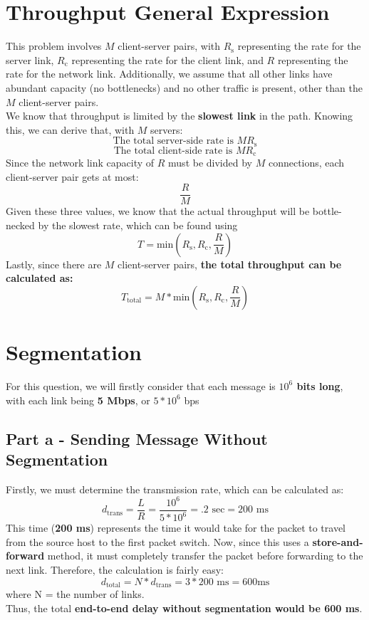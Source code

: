 \documentclass{article}
\begin{document}
\section{Throughput General Expression}
This problem involves $M$ client-server pairs, with $R_{\text{s}}$ representing the rate for the server link, $R_{\text{c}}$ representing the rate for the client link, and $R$ representing the rate for the network link. Additionally, we assume that all other links have abundant capacity (no bottlenecks) and no other traffic is present, other than the $M$ client-server pairs. \\
We know that throughput is limited by the \textbf{slowest link} in the path. Knowing this, we can derive that, with $M$ servers:
\[
\text{The total server-side rate is } M R_{\text{s}}
\]
\[
\text{The total client-side rate is } M R_{\text{c}}
\]
Since the network link capacity of $R$ must be divided by $M$ connections, each client-server pair gets at most: 
\[
\frac{R}{M}
\]
Given these three values, we know that the actual throughput will be bottle-necked by the slowest rate, which can be found using
\[
T = \text{min}(R_{\text{s}}, R_{\text{c}}, \frac{R}{M})
\]
Lastly, since there are $M$ client-server pairs, \textbf{the total throughput can be calculated as:}
\[
T_{\text{total}} = M * \text{min}(R_{\text{s}}, R_{\text{c}}, \frac{R}{M})
\]

\setcounter{section}{30}
\section{Segmentation}
For this question, we will firstly consider that each message is \textbf{$10^6$ bits long}, with each link being \textbf{5 Mbps}, or $5*10^6$ bps
\subsection{Part a - Sending Message Without Segmentation}
Firstly, we must determine the transmission rate, which can be calculated as:
\[
d_{\text{trans}} = \frac{L}{R} = \frac{10^6}{5*10^6} = .2 \text{ sec} = 200 \text{ ms}
\]
This time (\textbf{200 ms}) represents the time it would take for the packet to travel from the source host to the first packet switch. Now, since this uses a \textbf{store-and-forward} method, it must completely transfer the packet before forwarding to the next link. Therefore, the calculation is fairly easy:
\[
d_{\text{total}} = N * d_{\text{trans}} = 3 * 200 \text{ ms} = 600 \text{ms} 
\]
where N = the number of links. \\
Thus, the total \textbf{end-to-end delay without segmentation would be 600 ms}. 
\end{document}
